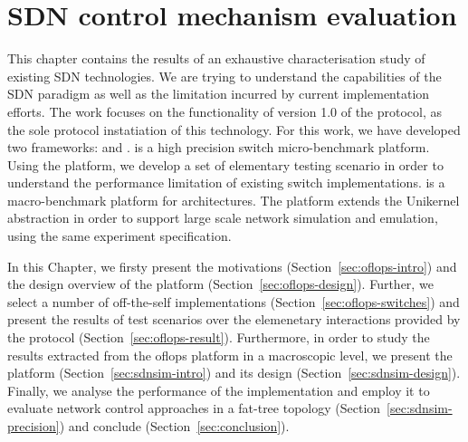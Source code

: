 \chapter{SDN control mechanism evaluation}
\ifpdf
    \graphicspath{{Chapter1/Chapter1Figs/PNG/}{Chapter1/Chapter1Figs/PDF/}{Chapter1/Chapter1Figs/}}
\else
    \graphicspath{{Chapter1/Chapter1Figs/EPS/}{Chapter1/Chapter1Figs/}}
\fi

This chapter contains the results of an exhaustive characterisation study of
existing SDN technologies. We are trying to understand the capabilities of the
SDN paradigm as well as the limitation incurred by current implementation
efforts. The work focuses on the functionality of version 1.0 of the \of
protocol, as the sole protocol instatiation of this technology. 
For this work, we have developed two
frameworks: \oflops and \sdnsim. \oflops is a high precision \of switch
micro-benchmark platform. Using the platform, we develop a set of elementary
testing scenario in order to understand the performance limitation of existing
\of switch implementations.  \sdnsim is a macro-benchmark platform for \of
architectures. The platform extends the Unikernel abstraction in order to
support large scale network simulation and emulation, using the same experiment
specification. 

In this Chapter, we firsty present the motivations (Section~\ref{sec:oflops-intro}) and
the design overview of the \oflops platform (Section~\ref{sec:oflops-design}).
Further, we select a number of off-the-self \of implementations
(Section~\ref{sec:oflops-switches}) and present the results of \oflops test
scenarios over the elemenetary interactions provided by the protocol
(Section~\ref{sec:oflops-result}). Furthermore, in order to study the results
extracted from the oflops platform in a macroscopic level, we present the
\sdnsim platform (Section~\ref{sec:sdnsim-intro}) and its design
(Section~\ref{sec:sdnsim-design}). Finally, we analyse the performance of the
\sdnsim implementation and employ it to evaluate network control approaches in a
fat-tree topology (Section~\ref{sec:sdnsim-precision}) and conclude
(Section~\ref{sec:conclusion}). 



